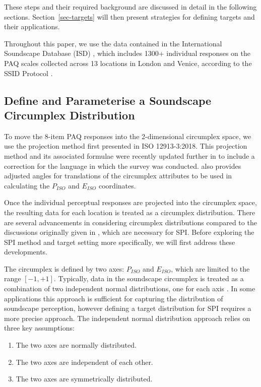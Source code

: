 \documentclass[
  authoryear,
  preprint,
  3p]{elsarticle}
\providecommand{\tightlist}{%
  \setlength{\itemsep}{0pt}\setlength{\parskip}{0pt}}\usepackage{longtable,booktabs,array}
\begin{document}
These steps and their required background are discussed in detail in the
following sections. Section~\ref{sec-targets} will then present
strategies for defining targets and their applications.

Throughout this paper, we use the data contained in the International
Soundscape Database (ISD) \citep{Mitchell2024International}, which
includes 1300+ individual responses on the PAQ scales collected across
13 locations in London and Venice, according to the SSID Protocol
\citet{Mitchell2020Soundscape}.

\subsection{Define and Parameterise a Soundscape Circumplex
Distribution}\label{sec-circumplex-distribution}

To move the 8-item PAQ responses into the 2-dimensional circumplex
space, we use the projection method first presented in ISO 12913-3:2018.
This projection method and its associated formulae were recently updated
further in \citet{Mitchell2023Testing} to include a correction for the
language in which the survey was conducted. \citet{Mitchell2023Testing}
also provides adjusted angles for translations of the circumplex
attributes to be used in calculating the \(P_{ISO}\) and \(E_{ISO}\)
coordinates.

Once the individual perceptual responses are projected into the
circumplex space, the resulting data for each location is treated as a
circumplex distribution. There are several advancements in considering
circumplex distributions compared to the discussions originally given in
\citet{Mitchell2022How}, which are necessary for SPI. Before exploring
the SPI method and target setting more specifically, we will first
address these developments.

The circumplex is defined by two axes: \(P_{ISO}\) and \(E_{ISO}\),
which are limited to the range \([-1, +1]\). Typically, data in the
soundscape circumplex is treated as a combination of two independent
normal distributions, one for each axis
\citep{Mitchell2022How, Ooi2022Probably}. In some applications this
approach is sufficient for capturing the distribution of soundscape
perception, however defining a target distribution for SPI requires a
more precise approach. The independent normal distribution approach
relies on three key assumptions:

\begin{enumerate}
\def\labelenumi{\arabic{enumi}.}
\tightlist
\item
  The two axes are normally distributed.
\item
  The two axes are independent of each other.
\item
  The two axes are symmetrically distributed.
\end{enumerate}
\end{document}
